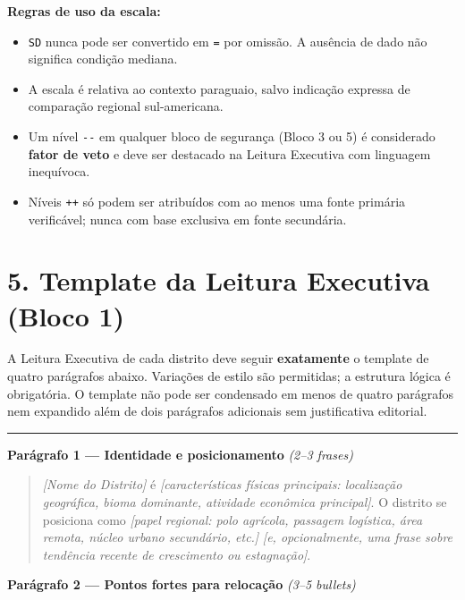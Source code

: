 \bigskip

\textbf{Regras de uso da escala:}

\begin{itemize}
  \item \texttt{SD} nunca pode ser convertido em \texttt{=} por omissão. A ausência de dado não significa condição mediana.
  \item A escala é relativa ao contexto paraguaio, salvo indicação expressa de comparação regional sul-americana.
  \item Um nível \texttt{-{}-} em qualquer bloco de segurança (Bloco 3 ou 5) é considerado \textbf{fator de veto} e deve ser destacado na Leitura Executiva com linguagem inequívoca.
  \item Níveis \texttt{++} só podem ser atribuídos com ao menos uma fonte primária verificável; nunca com base exclusiva em fonte secundária.
\end{itemize}

\section*{5. Template da Leitura Executiva (Bloco 1)}

A Leitura Executiva de cada distrito deve seguir \textbf{exatamente} o template de quatro parágrafos abaixo. Variações de estilo são permitidas; a estrutura lógica é obrigatória. O template não pode ser condensado em menos de quatro parágrafos nem expandido além de dois parágrafos adicionais sem justificativa editorial.

\bigskip
\noindent\rule{\linewidth}{0.4pt}
\medskip

\noindent\textbf{Parágrafo 1 — Identidade e posicionamento} \textit{(2–3 frases)}

\begin{quote}
\textit{[Nome do Distrito]} é \textit{[características físicas principais: localização geográfica, bioma dominante, atividade econômica principal]}. O distrito se posiciona como \textit{[papel regional: polo agrícola, passagem logística, área remota, núcleo urbano secundário, etc.]} \textit{[e, opcionalmente, uma frase sobre tendência recente de crescimento ou estagnação]}.
\end{quote}

\noindent\textbf{Parágrafo 2 — Pontos fortes para relocação} \textit{(3–5 bullets)}

